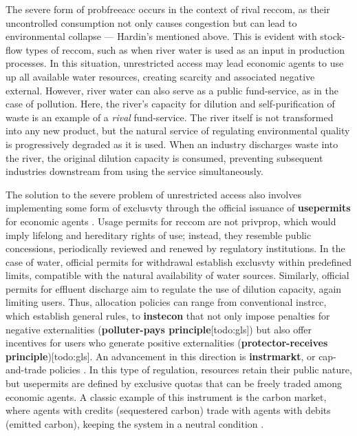 \documentclass[./main_en.tex]{subfiles}
\begin{document}
\par The severe form of \gls{probfreeacc} occurs in the context of rival \gls{reccom}, as their uncontrolled consumption not only causes congestion but can lead to environmental collapse — Hardin's  mentioned above. This is evident with stock-flow types of \gls{reccom}, such as when river water is used as an input in production processes. In this situation, unrestricted access may lead economic agents to use up all available water resources, creating scarcity and associated negative \gls{external}. However, river water can also serve as a public fund-service, as in the case of pollution. Here, the river's capacity for dilution and self-purification of waste is an example of a \textit{rival} fund-service. The river itself is not transformed into any new product, but the natural service of regulating environmental quality is progressively degraded as it is used. When an industry discharges waste into the river, the original dilution capacity is consumed, preventing subsequent industries downstream from using the service simultaneously.

\par The solution to the severe problem of unrestricted access also involves implementing some form of \gls{exclusvty} through the official issuance of \textbf{\gls{usepermits}} for economic agents \cite{Schlager1992}. Usage permits for \gls{reccom} are not \gls{privprop}, which would imply lifelong and hereditary rights of use; instead, they resemble public concessions, periodically reviewed and renewed by regulatory institutions. In the case of water, official permits for withdrawal establish \gls{exclusvty} within predefined limits, compatible with the natural availability of water sources. Similarly, official permits for effluent discharge aim to regulate the use of dilution capacity, again limiting users. Thus, allocation policies can range from conventional \gls{instrcc}, which establish general rules, to \textbf{\gls{instecon}} that not only impose penalties for negative externalities (\textbf{polluter-pays principle}[todo:gls]) but also offer incentives for users who generate positive externalities (\textbf{protector-receives principle})[todo:gls]. An advancement in this direction is \textbf{\gls{instrmarkt}}, or cap-and-trade policies \cite{Borghesi2013}. In this type of regulation, resources retain their public nature, but \gls{usepermits} are defined by exclusive quotas that can be freely traded among economic agents. A classic example of this instrument is the carbon market, where agents with credits (sequestered carbon) trade with agents with debits (emitted carbon), keeping the \gls{system} in a neutral condition \cite{Mazaheri2022}.
\end{document}
